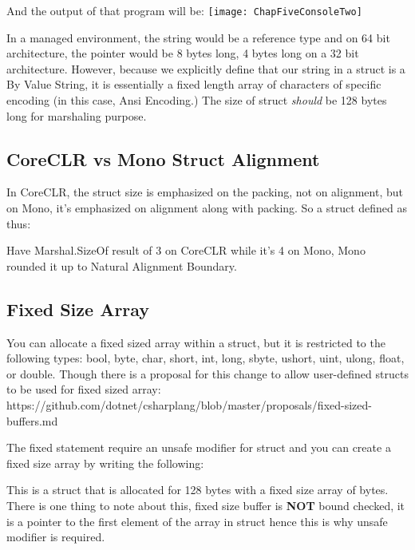 

And the output of that program will be:
\newline
\newline
\texttt{[image: ChapFiveConsoleTwo]}
\newpage

In a managed environment, the string would be a reference type and on 64 bit architecture, the pointer would be 8 bytes long, 4 bytes long on a 32 bit architecture. However, because we explicitly define that our string in a struct is a By Value String, it is essentially a fixed length array of characters of specific encoding (in this case, Ansi Encoding.) The size of struct \textit{should} be 128 bytes long for marshaling purpose.

\subsection{CoreCLR vs Mono Struct Alignment}
In CoreCLR, the struct size is emphasized on the packing, not on alignment, but on Mono, it's emphasized on alignment along with packing. So a struct defined as thus:



Have Marshal.SizeOf result of 3 on CoreCLR while it's 4 on Mono, Mono rounded it up to Natural Alignment Boundary.

\subsection{Fixed Size Array}
You can allocate a fixed sized array within a struct, but it is restricted to the following types: bool, byte, char, short, int, long, sbyte, ushort, uint, ulong, float, or double. Though there is a proposal for this change to allow user-defined structs to be used for fixed sized array: \newline \newline
https://github.com/dotnet/csharplang/blob/master/proposals/fixed-sized-buffers.md
\newline \newline

The fixed statement require an unsafe modifier for struct and you can create a fixed size array by writing the following:



This is a struct that is allocated for 128 bytes with a fixed size array of bytes. There is one thing to note about this, fixed size buffer is \textbf{NOT} bound checked, it is a pointer to the first element of the array in struct hence this is why unsafe modifier is required.

